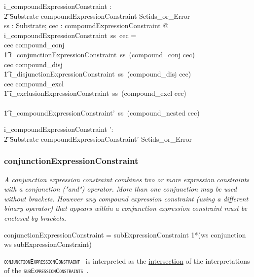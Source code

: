\documentclass{article}
\def\spec#1{{\tt \small \textsc{{#1}} }}
\def\bnf#1{{\scriptsize {{#1}} }}
\def\desc#1{{\small \textsl{{#1}} }}
\begin{document}
\begin{gendef}
   i\_compoundExpressionConstraint : \\
\t2 Substrate \fun compoundExpressionConstraint \fun Sctids\_or\_Error \\
\where
  \forall ss : Substrate; cec : compoundExpressionConstraint @ \\
 i\_compoundExpressionConstraint~ss~cec = \\
   \IF cec \in \ran compound\_conj \THEN  \\
\t1 i\_conjunctionExpressionConstraint~ss~(compound\_conj \inv cec) \\
    \ELSE \IF cec \in \ran compound\_disj \THEN \\
\t1 i\_disjunctionExpressionConstraint~ss~(compound\_disj \inv cec) \\
    \ELSE \IF cec \in \ran compound\_excl \THEN \\
\t1 i\_exclusionExpressionConstraint~ss~(compound\_excl \inv cec) \\
   \ELSE \\
\t1 i\_compoundExpressionConstraint'~ss~(compound\_nested \inv cec)
\end{gendef}
\begin{gendef}
   i\_compoundExpressionConstraint ': \\
\t2 Substrate \fun compoundExpressionConstraint' \fun Sctids\_or\_Error
\end{gendef}



\subsubsection{conjunctionExpressionConstraint}
\begin{framed}
\desc{A conjunction expression constraint combines two or more expression constraints with a conjunction ("and") operator. More than one conjunction may be used without brackets. However any compound expression constraint (using a different binary operator) that appears within a conjunction expression constraint must be enclosed by brackets.}
\end{framed}

\begin{framed}
\noindent
\bnf{conjunctionExpressionConstraint = subExpressionConstraint 1*(ws conjunction ws subExpressionConstraint)}
\end{framed}

\spec{conjunctionExpressionConstraint} is interpreted as the \underline{intersection} of the interpretations of the
\spec{subExpressionConstraints}.
\end{document}
